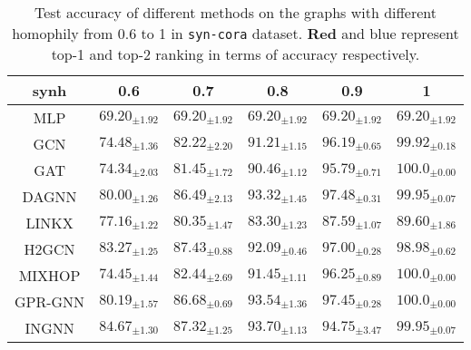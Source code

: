 \documentclass{article}
\theoremstyle{plain}
\newcommand{\pjn}{{INGNN}}
\begin{document}
\begin{table}[ht]
\centering
\caption{Test accuracy of different methods on the graphs with different homophily from 0.6 to 1 in \texttt{syn-cora} dataset. {\color{red} \textbf{Red}} and {\color{blue} blue} represent top-1 and top-2 ranking in terms of accuracy respectively.}
\label{tab:syn-cora-results2}
\vskip 0.1in
\small
\tabcolsep=0.1cm
\begin{tabular}{c|ccccc}
\toprule
synh    & 0.6                                                                                     & 0.7                                                                                     & 0.8                                                                                     & 0.9                                                                                     & 1                                                                                       \\
\midrule
\midrule
MLP	& $69.20_{\pm 1.92}$	 & $69.20_{\pm 1.92}$	 & $69.20_{\pm 1.92}$	 & $69.20_{\pm 1.92}$	 & $69.20_{\pm 1.92}$	 \\
GCN	& $74.48_{\pm 1.36}$	 & $82.22_{\pm 2.20}$	 & $91.21_{\pm 1.15}$	 & $96.19_{\pm 0.65}$	 & $99.92_{\pm 0.18}$	 \\
GAT	& $74.34_{\pm 2.03}$	 & $81.45_{\pm 1.72}$	 & $90.46_{\pm 1.12}$	 & $95.79_{\pm 0.71}$	 & {\color[HTML]{FF0000} $\mathbf{100.0_{\pm 0.00}}$} \\
DAGNN  & $80.00_{\pm 1.26}$	 & $86.49_{\pm 2.13}$	 & $93.32_{\pm 1.45}$	 & {\color[HTML]{FF0000} $\mathbf{97.48_{\pm 0.31}}$} & {\color[HTML]{0000FF} $99.95_{\pm 0.07}$}	  \\
LINKX  & $77.16_{\pm 1.22}$	 & $80.35_{\pm 1.47}$	 & $83.30_{\pm 1.23}$	 & $87.59_{\pm 1.07}$	 & $89.60_{\pm 1.86}$	 \\
H2GCN  & {\color[HTML]{0000FF} $83.27_{\pm 1.25}$}	  & {\color[HTML]{FF0000} $\mathbf{87.43_{\pm 0.88}}$} & $92.09_{\pm 0.46}$	 & $97.00_{\pm 0.28}$	 & $98.98_{\pm 0.62}$	 \\
MIXHOP & $74.45_{\pm 1.44}$	 & $82.44_{\pm 2.69}$	 & $91.45_{\pm 1.11}$	 & $96.25_{\pm 0.89}$	 & {\color[HTML]{FF0000} $\mathbf{100.0_{\pm 0.00}}$} \\
GPR-GNN & $80.19_{\pm 1.57}$	 & $86.68_{\pm 0.69}$	 & {\color[HTML]{0000FF} $93.54_{\pm 1.36}$}	  & {\color[HTML]{0000FF} $97.45_{\pm 0.28}$}	  & {\color[HTML]{FF0000} $\mathbf{100.0_{\pm 0.00}}$} \\
\pjn{}   & {\color[HTML]{FF0000} $\mathbf{84.67_{\pm 1.30}}$} & {\color[HTML]{0000FF} $87.32_{\pm 1.25}$}	  & {\color[HTML]{FF0000} $\mathbf{93.70_{\pm 1.13}}$} & $94.75_{\pm 3.47}$	 & {\color[HTML]{0000FF} $99.95_{\pm 0.07}$}	 \\
\bottomrule
\end{tabular}
\end{table}
\end{document}
